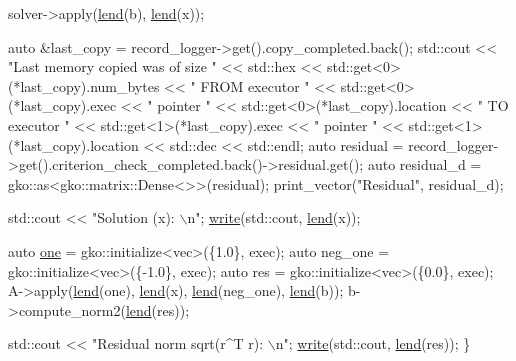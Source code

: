 \begin{DoxyCodeInclude}
    solver->apply(\hyperlink{namespacegko_aa8cb4876b72e5e1036ea9575443c439b}{lend}(b), \hyperlink{namespacegko_aa8cb4876b72e5e1036ea9575443c439b}{lend}(x));

    \textcolor{keyword}{auto} &last\_copy = record\_logger->get().copy\_completed.back();
    std::cout << \textcolor{stringliteral}{"Last memory copied was of size "} << std::hex
              << std::get<0>(*last\_copy).num\_bytes << \textcolor{stringliteral}{" FROM executor "}
              << std::get<0>(*last\_copy).exec << \textcolor{stringliteral}{" pointer "}
              << std::get<0>(*last\_copy).location << \textcolor{stringliteral}{" TO executor "}
              << std::get<1>(*last\_copy).exec << \textcolor{stringliteral}{" pointer "}
              << std::get<1>(*last\_copy).location << std::dec << std::endl;
    \textcolor{keyword}{auto} residual =
        record\_logger->get().criterion\_check\_completed.back()->residual.get();
    \textcolor{keyword}{auto} residual\_d = gko::as<gko::matrix::Dense<>>(residual);
    print\_vector(\textcolor{stringliteral}{"Residual"}, residual\_d);

    std::cout << \textcolor{stringliteral}{"Solution (x): \(\backslash\)n"};
    \hyperlink{namespacegko_a859dc47a462721d83728d91ab7fa2148}{write}(std::cout, \hyperlink{namespacegko_aa8cb4876b72e5e1036ea9575443c439b}{lend}(x));

    \textcolor{keyword}{auto} \hyperlink{namespacegko_a0059e27f8f4bc348ff65c1e60caf47c8}{one} = gko::initialize<vec>(\{1.0\}, exec);
    \textcolor{keyword}{auto} neg\_one = gko::initialize<vec>(\{-1.0\}, exec);
    \textcolor{keyword}{auto} res = gko::initialize<vec>(\{0.0\}, exec);
    A->apply(\hyperlink{namespacegko_aa8cb4876b72e5e1036ea9575443c439b}{lend}(one), \hyperlink{namespacegko_aa8cb4876b72e5e1036ea9575443c439b}{lend}(x), \hyperlink{namespacegko_aa8cb4876b72e5e1036ea9575443c439b}{lend}(neg\_one), \hyperlink{namespacegko_aa8cb4876b72e5e1036ea9575443c439b}{lend}(b));
    b->compute\_norm2(\hyperlink{namespacegko_aa8cb4876b72e5e1036ea9575443c439b}{lend}(res));

    std::cout << \textcolor{stringliteral}{"Residual norm sqrt(r^T r): \(\backslash\)n"};
    \hyperlink{namespacegko_a859dc47a462721d83728d91ab7fa2148}{write}(std::cout, \hyperlink{namespacegko_aa8cb4876b72e5e1036ea9575443c439b}{lend}(res));
\}
\end{DoxyCodeInclude}
 